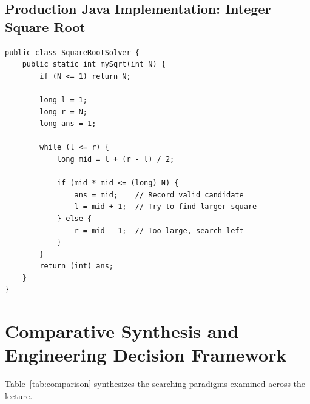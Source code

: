 \documentclass[10pt,journal,compsoc,onecolumn]{IEEEtran}
\begin{document}
\subsection{Production Java Implementation: Integer Square Root}

\begin{verbatim}
public class SquareRootSolver {
    public static int mySqrt(int N) {
        if (N <= 1) return N;

        long l = 1;
        long r = N;
        long ans = 1;

        while (l <= r) {
            long mid = l + (r - l) / 2;

            if (mid * mid <= (long) N) {
                ans = mid;    // Record valid candidate
                l = mid + 1;  // Try to find larger square
            } else {
                r = mid - 1;  // Too large, search left
            }
        }
        return (int) ans;
    }
}
\end{verbatim}

\section{Comparative Synthesis and Engineering Decision Framework}
\label{sec:synthesis}

Table~\ref{tab:comparison} synthesizes the searching paradigms examined across the lecture.
\end{document}
